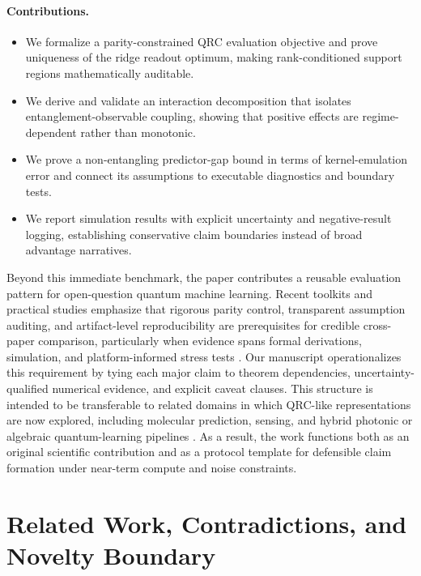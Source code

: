 \paragraph{Contributions.}
\begin{itemize}
\item We formalize a parity-constrained QRC evaluation objective and prove uniqueness of the ridge readout optimum, making rank-conditioned support regions mathematically auditable.
\item We derive and validate an interaction decomposition that isolates entanglement-observable coupling, showing that positive effects are regime-dependent rather than monotonic.
\item We prove a non-entangling predictor-gap bound in terms of kernel-emulation error and connect its assumptions to executable diagnostics and boundary tests.
\item We report simulation results with explicit uncertainty and negative-result logging, establishing conservative claim boundaries instead of broad advantage narratives.
\end{itemize}

Beyond this immediate benchmark, the paper contributes a reusable evaluation pattern for open-question quantum machine learning. Recent toolkits and practical studies emphasize that rigorous parity control, transparent assumption auditing, and artifact-level reproducibility are prerequisites for credible cross-paper comparison, particularly when evidence spans formal derivations, simulation, and platform-informed stress tests \citep{S017,S023,S024,S032,S036}. Our manuscript operationalizes this requirement by tying each major claim to theorem dependencies, uncertainty-qualified numerical evidence, and explicit caveat clauses. This structure is intended to be transferable to related domains in which QRC-like representations are now explored, including molecular prediction, sensing, and hybrid photonic or algebraic quantum-learning pipelines \citep{S005,S008,S011,S013,S016,S021,S027,S031,S039}. As a result, the work functions both as an original scientific contribution and as a protocol template for defensible claim formation under near-term compute and noise constraints.

\section{Related Work, Contradictions, and Novelty Boundary}\label{sec:related}
